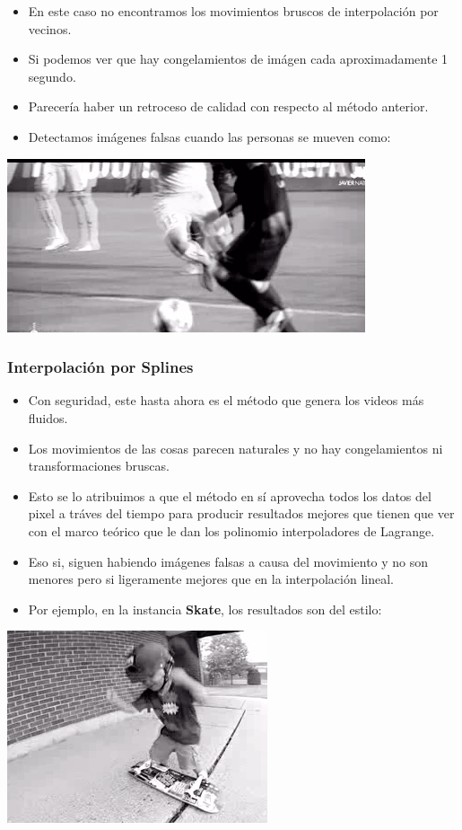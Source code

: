 \begin{itemize}
\item En este caso no encontramos los movimientos bruscos de interpolación por vecinos.
\item Si podemos ver que hay congelamientos de imágen cada aproximadamente 1 segundo.
\item Parecería haber un retroceso de calidad con respecto al método anterior.
\item Detectamos imágenes falsas cuando las personas se mueven como:
\end{itemize}

\includegraphics[scale=1]{imagenes/art1.png}

\subsubsection{Interpolación por Splines}

\begin{itemize}
\item Con seguridad, este hasta ahora es el método que genera los videos más fluidos.
\item Los movimientos de las cosas parecen naturales y no hay congelamientos ni transformaciones bruscas.
\item Esto se lo atribuimos a que el método en sí aprovecha todos los datos del pixel a tráves del tiempo para producir resultados mejores que tienen que ver con el marco teórico que le dan los polinomio interpoladores de Lagrange.
\item Eso si, siguen habiendo imágenes falsas a causa del movimiento y no son menores pero si ligeramente mejores que en la interpolación lineal.
\item Por ejemplo, en la instancia \textbf{Skate}, los resultados son del estilo:
\end{itemize}

\includegraphics[scale=1]{imagenes/art2.png}

